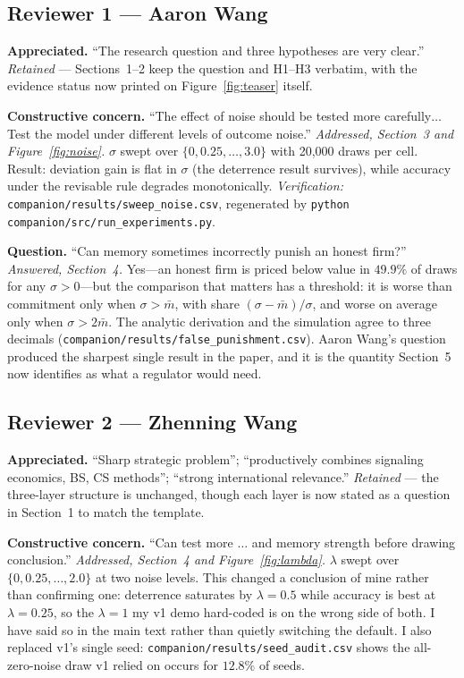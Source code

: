 \subsection{Reviewer 1 --- Aaron Wang}
\textbf{Appreciated.} ``The research question and three hypotheses are very
clear.'' \emph{Retained} --- Sections~1--2 keep the question and H1--H3 verbatim,
with the evidence status now printed on Figure~\ref{fig:teaser} itself.

\textbf{Constructive concern.} ``The effect of noise should be tested more
carefully$\ldots$ Test the model under different levels of outcome noise.''
\emph{Addressed, Section~3 and Figure~\ref{fig:noise}.} $\sigma$ swept over
$\{0,0.25,\ldots,3.0\}$ with 20{,}000 draws per cell. Result: deviation gain is
flat in $\sigma$ (the deterrence result survives), while accuracy under the
revisable rule degrades monotonically. \emph{Verification:}
\texttt{companion/results/sweep\_noise.csv}, regenerated by
\texttt{python companion/src/run\_experiments.py}.

\textbf{Question.} ``Can memory sometimes incorrectly punish an honest firm?''
\emph{Answered, Section~4.} Yes---an honest firm is priced below value in
$49.9\%$ of draws for any $\sigma>0$---but the comparison that matters has a
threshold: it is worse than commitment only when $\sigma>\bar m$, with share
$(\sigma-\bar m)/\sigma$, and worse on average only when $\sigma>2\bar m$. The
analytic derivation and the simulation agree to three decimals
(\texttt{companion/results/false\_punishment.csv}). Aaron Wang's question produced the
sharpest single result in the paper, and it is the quantity Section~5 now
identifies as what a regulator would need.

\subsection{Reviewer 2 --- Zhenning Wang}
\textbf{Appreciated.} ``Sharp strategic problem''; ``productively combines
signaling economics, BS, CS methods''; ``strong international relevance.''
\emph{Retained} --- the three-layer structure is unchanged, though each layer is
now stated as a question in Section~1 to match the template.

\textbf{Constructive concern.} ``Can test more $\ldots$ and memory strength
before drawing conclusion.'' \emph{Addressed, Section~4 and
Figure~\ref{fig:lambda}.} $\lambda$ swept over $\{0,0.25,\ldots,2.0\}$ at two
noise levels. This changed a conclusion of mine rather than confirming one:
deterrence saturates by $\lambda=0.5$ while accuracy is best at $\lambda=0.25$,
so the $\lambda=1$ my v1 demo hard-coded is on the wrong side of both. I have
said so in the main text rather than quietly switching the default.
I also replaced v1's single seed: \texttt{companion/results/seed\_audit.csv} shows the
all-zero-noise draw v1 relied on occurs for $12.8\%$ of seeds.

